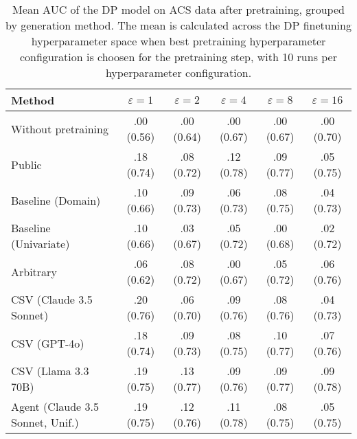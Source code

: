 \begin{table}[h!]
    \centering
    \caption{Mean AUC of the DP model on ACS data after pretraining, grouped by generation method. The mean is calculated across the DP finetuning hyperparameter space when best pretraining hyperparameter configuration is choosen for the pretraining step, with 10 runs per hyperparameter configuration.}
    \label{tab:epsilon_comparison}
    \begin{tabular}{lccccc}
    \toprule
    Method & $\varepsilon=1$ & $\varepsilon=2$ & $\varepsilon=4$ & $\varepsilon=8$ & $\varepsilon=16$ \\
    \midrule
    Without pretraining & .00 {\small (0.56)} & .00 {\small (0.64)} & .00 {\small (0.67)} & .00 {\small (0.67)} & .00 {\small (0.70)} \\
    \arrayrulecolor{black!50!}\midrule
    Public & .18 {\small (0.74)} & .08 {\small (0.72)} & \cellcolor{gold!30}.12 {\small (0.78)} & \cellcolor{bronze!30}.09 {\small (0.77)} & .05 {\small (0.75)} \\
    \arrayrulecolor{black!50!}\midrule
    Baseline (Domain) & .10 {\small (0.66)} & .09 {\small (0.73)} & .06 {\small (0.73)} & .08 {\small (0.75)} & .04 {\small (0.73)} \\
    Baseline (Univariate) & .10 {\small (0.66)} & .03 {\small (0.67)} & .05 {\small (0.72)} & .00 {\small (0.68)} & .02 {\small (0.72)} \\
    \arrayrulecolor{black!50!}\midrule
    Arbitrary & .06 {\small (0.62)} & .08 {\small (0.72)} & .00 {\small (0.67)} & .05 {\small (0.72)} & \cellcolor{bronze!30}.06 {\small (0.76)} \\
    \arrayrulecolor{black!50!}\midrule
    CSV (Claude 3.5 Sonnet) & \cellcolor{silver!30}.20 {\small (0.76)} & .06 {\small (0.70)} & .09 {\small (0.76)} & .08 {\small (0.76)} & .04 {\small (0.73)} \\
    CSV (GPT-4o) & .18 {\small (0.74)} & .09 {\small (0.73)} & .08 {\small (0.75)} & \cellcolor{silver!30}.10 {\small (0.77)} & \cellcolor{silver!30}.07 {\small (0.76)} \\
    CSV (Llama 3.3 70B) & \cellcolor{bronze!30}.19 {\small (0.75)} & \cellcolor{gold!30}.13 {\small (0.77)} & \cellcolor{bronze!30}.09 {\small (0.76)} & \cellcolor{bronze!30}.09 {\small (0.77)} & \cellcolor{gold!30}.09 {\small (0.78)} \\
    \arrayrulecolor{black!50!}\midrule
    Agent (Claude 3.5 Sonnet, Unif.) & \cellcolor{bronze!30}.19 {\small (0.75)} & \cellcolor{silver!30}.12 {\small (0.76)} & \cellcolor{silver!30}.11 {\small (0.78)} & .08 {\small (0.75)} & .05 {\small (0.75)} \\

\end{tabular}
\end{table}
